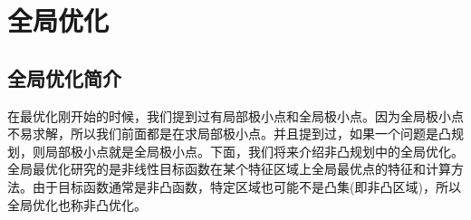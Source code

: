 
\chapter{全局优化}

\section{全局优化简介}
    \par
    在最优化刚开始的时候，我们提到过有局部极小点和全局极小点。因为全局极小点不易求解，所以我们前面都是在求局部极小点。并且提到过，如果一个问题是凸规划，则局部极小点就是全局极小点。下面，我们将来介绍非凸规划中的全局优化。全局最优化研究的是非线性目标函数在某个特征区域上全局最优点的特征和计算方法。由于目标函数通常是非凸函数，特定区域也可能不是凸集(即非凸区域)，所以全局优化也称非凸优化。

